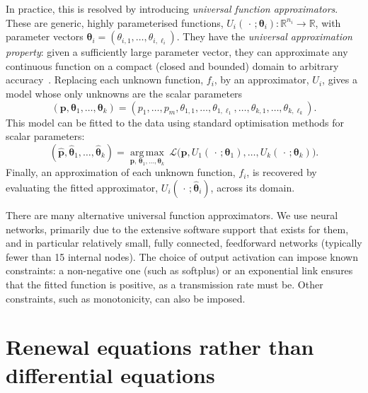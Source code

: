 \documentclass[11pt,a4paper]{article}
\renewcommand{\vec}[1]{\boldsymbol{#1}}
\begin{document}
In practice, this is resolved by introducing \emph{universal function approximators}. These are generic, highly parameterised functions, $U_i(\,\cdot\,;\vec{\theta}_i):\mathbb{R}^{n_i} \to \mathbb{R}$, with parameter vectors $\vec{\theta}_i = (\theta_{i,1}, \ldots, \theta_{i,\ell_i})$. They have the \emph{universal approximation property}: given a sufficiently large parameter vector, they can approximate any continuous function on a compact (closed and bounded) domain to arbitrary accuracy~\cite{hornik1989multilayer, leshno1993multilayer}. Replacing each unknown function, $f_i$, by an approximator, $U_i$, gives a model whose only unknowns are the scalar parameters
\begin{equation*}
    (\vec{p}, \vec{\theta}_1, \ldots, \vec{\theta}_k) = (p_1, \ldots, p_m, \theta_{1,1}, \ldots, \theta_{1,\ell_1}, \ldots, \theta_{k,1}, \ldots, \theta_{k,\ell_k}).
\end{equation*}
This model can be fitted to the data using standard optimisation methods for scalar parameters:
\begin{equation*}
    (\hat{\vec{p}}, \hat{\vec{\theta}}_1, \ldots, \hat{\vec{\theta}}_k) = \operatorname*{arg\,max}_{\vec{p},\, \vec{\theta}_1, \ldots, \vec{\theta}_k}\ \mathcal{L}\bigl(\vec{p}, U_1(\,\cdot\,;\vec{\theta}_1), \ldots, U_k(\,\cdot\,;\vec{\theta}_k)\bigr).
\end{equation*}
Finally, an approximation of each unknown function, $f_i$, is recovered by evaluating the fitted approximator, $U_i(\,\cdot\,;\hat{\vec{\theta}}_i)$, across its domain.

There are many alternative universal function approximators. We use neural networks, primarily due to the extensive software support that exists for them, and in particular relatively small, fully connected, feedforward networks (typically fewer than 15 internal nodes). The choice of output activation can impose known constraints: a non-negative one (such as softplus) or an exponential link ensures that the fitted function is positive, as a transmission rate must be. Other constraints, such as monotonicity, can also be imposed.

\section{Renewal equations rather than differential equations}\label{sec:renewal}
\end{document}
